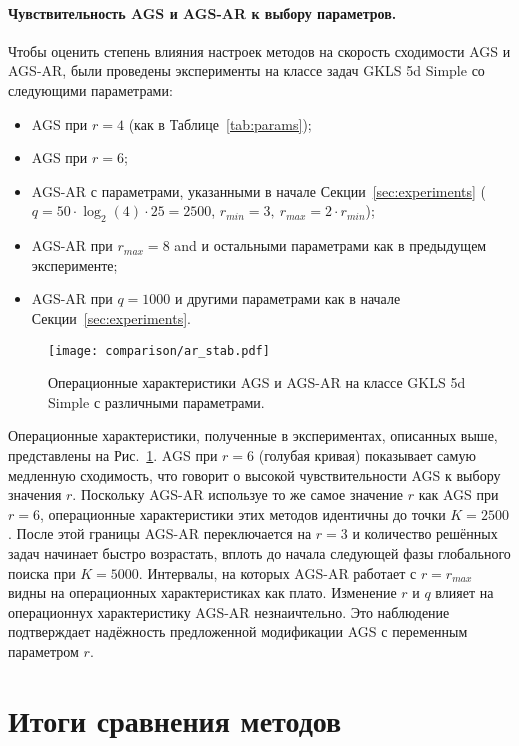 \paragraph{Чувствительность AGS и AGS-AR к выбору параметров.}

Чтобы оценить степень влияния настроек методов на скорость сходимости AGS и AGS-AR, были проведены
эксперименты на классе задач GKLS 5d Simple со следующими параметрами:
\begin{itemize}
  \item AGS при $r=4$ (как в Таблице~\ref{tab:params});
  \item AGS при $r=6$;
  \item AGS-AR с параметрами, указанными в начале Секции~\ref{sec:experiments}
  ($q=50\cdot\log_2(4)\cdot 25 = 2500$, $r_{min}=3,\:r_{max}=2\cdot r_{min}$);
  \item AGS-AR при $r_{max}=8$ and и остальными параметрами как в предыдущем эксперименте;
  \item AGS-AR при $q=1000$ и другими параметрами как в начале Секции~\ref{sec:experiments}.
\end{itemize}

\begin{figure}[ht]
  \centering
  \texttt{[image: comparison/ar\_stab.pdf]}
  \caption{Операционные характеристики AGS и AGS-AR на классе GKLS 5d Simple
  с различными параметрами.}
  \label{fig:stability}
\end{figure}

Операционные характеристики, полученные в экспериментах, описанных выше, представлены на Рис.~\ref{fig:stability}.
AGS при $r=6$ (голубая кривая) показывает самую медленную сходимость, что говорит о высокой чувствительности AGS
к выбору значения $r$. Поскольку AGS-AR используе то же самое значение $r$ как AGS при $r=6$, операционные характеристики
этих методов идентичны до точки $K=2500$. После этой границы AGS-AR переключается на $r=3$ и количество решённых задач
начинает быстро возрастать, вплоть до начала следующей фазы глобального поиска при $K=5000$. Интервалы, на которых
AGS-AR работает с $r=r_{max}$ видны на операционных характеристиках как плато. Изменение $r$ и $q$ влияет на операционнух характеристику
AGS-AR незнаичтельно. Это наблюдение подтверждает надёжность предложенной модификации AGS с переменным параметром $r$.

\section{Итоги сравнения методов}

